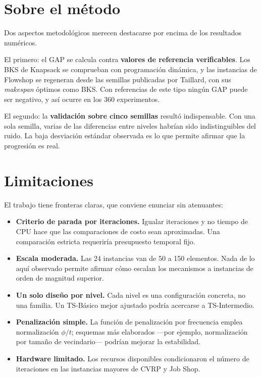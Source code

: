 \section{Sobre el método}

Dos aspectos metodológicos merecen destacarse por encima de los resultados
numéricos.

El primero: el GAP se calcula contra \textbf{valores de referencia
verificables}. Los BKS de Knapsack se comprueban con programación dinámica,
y las instancias de Flowshop se regeneran desde las semillas publicadas por
Taillard, con sus \emph{makespan} óptimos como BKS. Con referencias de este
tipo ningún GAP puede ser negativo, y así ocurre en los 360 experimentos.

El segundo: la \textbf{validación sobre cinco semillas} resultó
indispensable. Con una sola semilla, varias de las diferencias entre niveles
habrían sido indistinguibles del ruido. La baja desviación estándar
observada es lo que permite afirmar que la progresión es real.

\section{Limitaciones}

El trabajo tiene fronteras claras, que conviene enunciar sin atenuantes:

\begin{itemize}
  \item \textbf{Criterio de parada por iteraciones.} Igualar iteraciones y no
    tiempo de CPU hace que las comparaciones de costo sean aproximadas. Una
    comparación estricta requeriría presupuesto temporal fijo.
  \item \textbf{Escala moderada.} Las 24 instancias van de 50 a 150
    elementos. Nada de lo aquí observado permite afirmar cómo escalan los
    mecanismos a instancias de orden de magnitud superior.
  \item \textbf{Un solo diseño por nivel.} Cada nivel es una configuración
    concreta, no una familia. Un TS-Básico mejor ajustado podría acercarse a
    TS-Intermedio.
  \item \textbf{Penalización simple.} La función de penalización por
    frecuencia emplea normalización $\phi/t$; esquemas más elaborados —por
    ejemplo, normalización por tamaño de vecindario— podrían mejorar la
    estabilidad.
  \item \textbf{Hardware limitado.} Los recursos disponibles condicionaron el
    número de iteraciones en las instancias mayores de CVRP y Job Shop.
\end{itemize}

